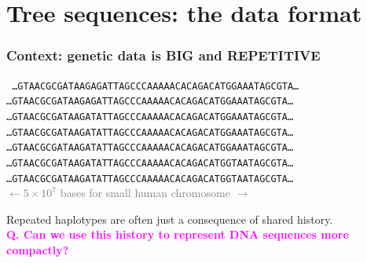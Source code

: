 \documentclass[11pt, mathserif, aspectratio=169]{beamer}
\newcommand{\magenta}[1]{\textcolor{magenta}{#1}}
\newcommand{\gray}[1]{\textcolor{gray}{#1}}
\newenvironment{wideitemize}{\itemize\addtolength{\itemsep}{10pt}}{\enditemize}
\begin{document}
%
%


\section{Tree sequences: the data format}

\begin{frame}
\frametitle{Context: genetic data is BIG and REPETITIVE}
 \begin{center}
{\tt
\ldots GTAACGCGATAAGAGATTAGCCCAAAAACACAGACATGGAAATAGCGTA\ldots \\
\ldots GTAACGCGATAAGAGATTAGCCCAAAAACACAGACATGGAAATAGCGTA\ldots \\
\ldots GTAACGCGATAAGATATTAGCCCAAAAACACAGACATGGAAATAGCGTA\ldots \\
\ldots GTAACGCGATAAGATATTAGCCCAAAAACACAGACATGGAAATAGCGTA\ldots \\
\ldots GTAACGCGATAAGATATTAGCCCAAAAACACAGACATGGAAATAGCGTA\ldots \\
\ldots GTAACGCGATAAGATATTAGCCCAAAAACACAGACATGGTAATAGCGTA\ldots \\
\ldots GTAACGCGATAAGATATTAGCCCAAAAACACAGACATGGTAATAGCGTA\ldots \\[3mm]
}
\gray{\footnotesize $\leftarrow 5\times 10^7$ bases for small human chromosome $\rightarrow$}
\end{center}
Repeated haplotypes are often just a consequence of shared history.\\[3mm]
\magenta{\bf Q. Can we use this history to represent DNA sequences more compactly?}
\end{frame}
\end{document}
